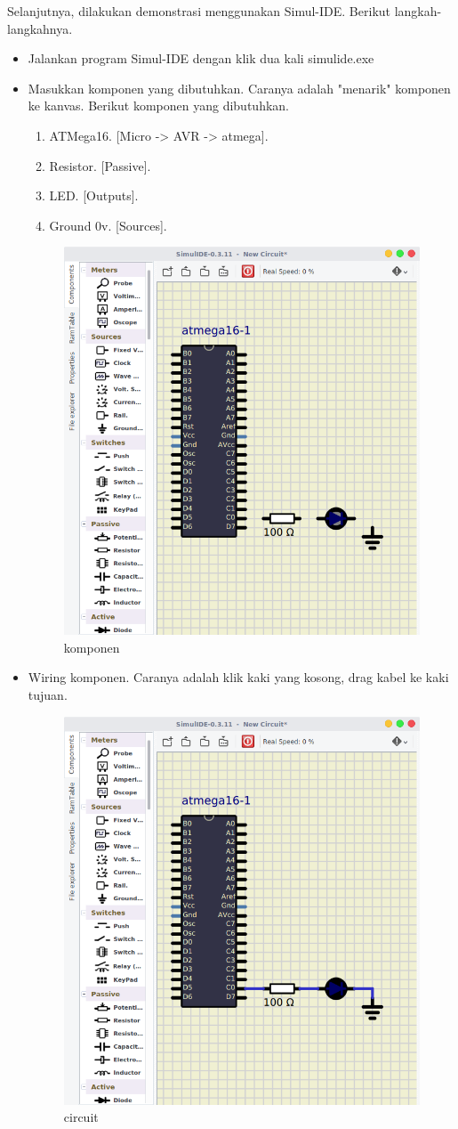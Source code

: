 \documentclass[12pt,]{article}
\begin{document}
	Selanjutnya, dilakukan demonstrasi menggunakan Simul-IDE.
	Berikut langkah-langkahnya.
	\begin{itemize}
		\item Jalankan program Simul-IDE dengan klik dua kali simulide.exe

		\item Masukkan komponen yang dibutuhkan.
		Caranya adalah "menarik" komponen ke kanvas.
		Berikut komponen yang dibutuhkan.
		\begin{enumerate}
			\item ATMega16. [Micro -> AVR -> atmega].
			\item Resistor. [Passive].
			\item LED. [Outputs].
			\item Ground 0v. [Sources].
		\end{enumerate}

		\begin{figure}[H]
			\centering
			\includegraphics[width=0.7\linewidth]{images/tessim_0}
			\caption{komponen}
		\end{figure}

		\newpage
		\item Wiring komponen.
		Caranya adalah klik kaki yang kosong, drag kabel ke kaki tujuan.

		\begin{figure}[H]
			\centering
			\includegraphics[width=0.5\linewidth]{images/tessim_1}
			\caption{circuit}
		\end{figure}


\end{itemize}
\end{document}
